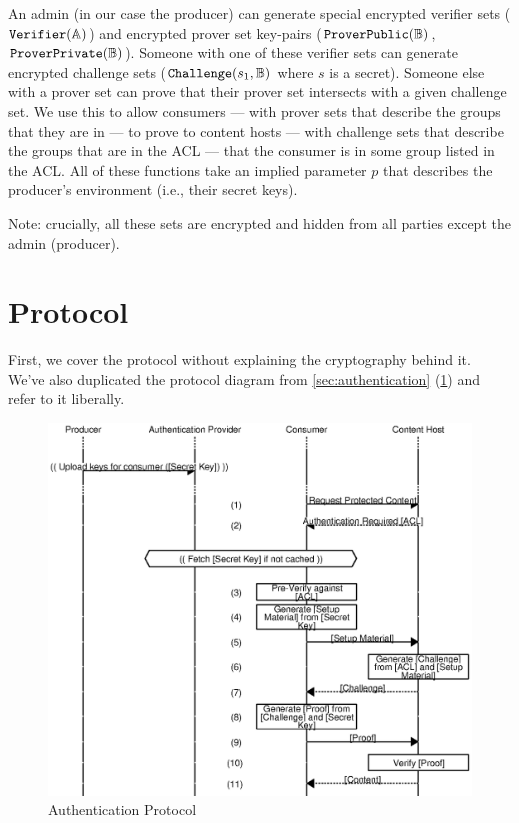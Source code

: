 \documentclass[pdftex,12pt,a4papaer,twoside,notitlepage]{report}
\begin{document}
An admin (in our case the producer) can generate special encrypted verifier sets
($\operatorname{\mathtt{Verifier}}(\mathbb{A})$) and encrypted prover set key-pairs ($\operatorname{\mathtt{ProverPublic}}(\mathbb{B})$, $\operatorname{\mathtt{ProverPrivate}}(\mathbb{B})$). Someone with one of
these verifier sets can generate encrypted challenge sets ($\operatorname{\mathtt{Challenge}}(s_1, \mathbb{B})$ where $s$ is a
secret). Someone else with a prover set can prove that their prover set
intersects with a given challenge set. We use this to allow consumers --- with
prover sets that describe the groups that they are in --- to prove to content
hosts --- with challenge sets that describe the groups that are in the ACL ---
that the consumer is in some group listed in the ACL. All of these functions
take an implied parameter $p$ that describes the producer's environment (i.e.,
their secret keys).

Note: crucially, all these sets are encrypted and hidden from all parties except
the admin (producer).

\section{Protocol}
\label{sec:proto-detail}

First, we cover the protocol without explaining the cryptography behind it.
We've also duplicated the protocol diagram from \cref{sec:authentication}
(\cref{fig:auth2}) and refer to it liberally.

\begin{figure}
    \includegraphics{auth.eps}
    \caption{Authentication Protocol}
    \label{fig:auth2}
\end{figure}
\end{document}
